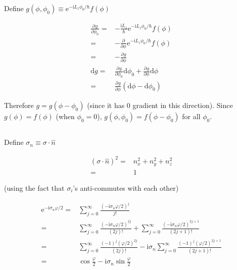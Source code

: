 \documentclass[10pt,fleqn]{article}
\newcommand{\ud}{\mathrm{d}}
\newcommand{\ue}{\mathrm{e}}
\newcommand{\ui}{\mathrm{i}}
\newcommand{\eqar}[1]
{
  \begin{align*}
    #1
  \end{align*}
}
\newcommand{\paren}[1]{{\left({#1}\right)}}
\newcommand{\pdiff}[3][{}]{{\frac{\partial^{#1} {#2}}{\partial {#3}{}^{#1}}}}
\begin{document}
\section{}
\subsection{}
Define $g(\phi, \phi_0)\equiv\ue^{-\ui L_z\phi_0/\hbar}f(\phi)$
\eqar{
  \pdiff{g}{\phi_0}=&-\frac{\ui L_z}{\hbar}\ue^{-\ui L_z\phi_0/\hbar}f(\phi)\\
  =&-\pdiff{}{\phi}\ue^{-\ui L_z\phi_0/\hbar}f(\phi)\\
  =&-\pdiff{g}{\phi}\\
  \ud g=&\pdiff{g}{\phi_0}\ud\phi_0+\pdiff{g}{\phi}\ud\phi\\
  =&\pdiff{g}{\phi}\paren{\ud\phi-\ud\phi_0}
}
Therefore $g=g(\phi-\phi_0)$ (since it has $0$ gradient in this direction).
Since $g(\phi) = f(\phi)$ (when $\phi_0 = 0$), $g(\phi, \phi_0) = f(\phi - \phi_0)$ for all $\phi_0$.
\subsection{}
Define $\sigma_n\equiv\sigma\cdot\hat n$
\eqar{
  \paren{\sigma\cdot\hat n}^2=&n_x^2 + n_y^2 + n_z^2\\
  =&1
}
(using the fact that $\sigma_i$'s anti-commutes with each other)
\eqar{
  \ue^{-\ui\sigma_n\varphi/2}=&\sum_{j=0}^\infty\frac{\paren{-\ui\sigma_n\varphi/2}^j}{j!}\\
  =&\sum_{j=0}^\infty\frac{\paren{-\ui\sigma_n\varphi/2}^{2j}}{(2j)!}+\sum_{j=0}^\infty\frac{\paren{-\ui\sigma_n\varphi/2}^{2j+1}}{(2j+1)!}\\
  =&\sum_{j=0}^\infty\frac{\paren{-1}^{j}\paren{\varphi/2}^{2j}}{(2j)!}-\ui\sigma_n\sum_{j=0}^\infty\frac{\paren{-1}^{j}\paren{\varphi/2}^{2j+1}}{(2j+1)!}\\
  =&\cos\frac{\varphi}{2}-\ui\sigma_n\sin\frac{\varphi}{2}
}
\subsection{}
\subsection{}
\subsection{}
\section{}
\subsection{}
\subsection{}
\subsection{}
\end{document}
